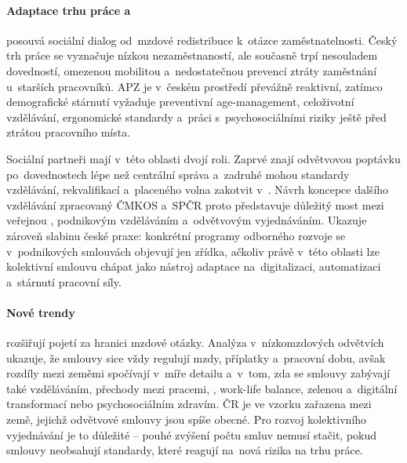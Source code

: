 \paragraph{Adaptace trhu práce a~} posouvá sociální dialog od~mzdové redistribuce k~otázce zaměstnatelnosti. Český trh práce se vyznačuje nízkou nezaměstnaností, ale současně trpí nesouladem dovedností, omezenou mobilitou a~nedostatečnou prevencí ztráty zaměstnání u~starších pracovníků. \Ac{APZ} je v~českém prostředí převážně reaktivní, zatímco demografické stárnutí vyžaduje preventivní age-management, celoživotní vzdělávání, ergonomické standardy a~práci s~psychosociálními riziky ještě před ztrátou pracovního místa.~\cite{Dvorakova_AEP_SustainHRM2023}~\cite{Dvorakova_DemografickeTrendy2025}\par

Sociální partneři mají v~této oblasti dvojí roli. Zaprvé znají odvětvovou poptávku po~dovednostech lépe než centrální správa a~zadruhé mohou standardy vzdělávání, rekvalifikací a~placeného volna zakotvit v~. Návrh koncepce dalšího vzdělávání zpracovaný \acs{ČMKOS} a~\acs{SPČR} proto představuje důležitý most mezi veřejnou , podnikovým vzděláváním a~odvětvovým vyjednáváním. Ukazuje zároveň slabinu české praxe: konkrétní programy odborného rozvoje se v~podnikových smlouvách objevují jen zřídka, ačkoliv právě v~této oblasti lze kolektivní smlouvu chápat jako nástroj adaptace na~digitalizaci, automatizaci a~stárnutí pracovní síly.~\cite{Koncepce_DalsihoVzdelavani_SP}~\cite{InovacniDoporuceni_ZahraniceKV}\par

\paragraph{Nové trendy} rozšiřují pojetí  za hranici mzdové otázky. Analýza  v~nízkomzdových odvětvích ukazuje, že smlouvy sice vždy regulují mzdy, příplatky a~pracovní dobu, avšak rozdíly mezi zeměmi spočívají v~míře detailu a~v~tom, zda se smlouvy zabývají také vzděláváním, přechody mezi pracemi, , work-life balance, zelenou a~digitální transformací nebo psychosociálním zdravím. \Ac{ČR} je ve vzorku zařazena mezi země, jejichž odvětvové smlouvy jsou spíše obecné. Pro rozvoj kolektivního vyjednávání je to důležité -- pouhé zvýšení počtu smluv nemusí stačit, pokud smlouvy neobsahují standardy, které reagují na~nová rizika na trhu práce.~\cite{Eurofound_CBBeyondPay_2024}\par

